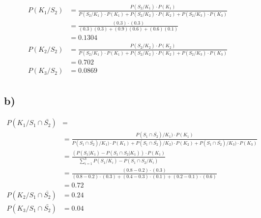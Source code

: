 \documentclass{article}
\begin{document}
\begin{align*}
P(K_1/ S_2) &= \frac{P(S_2/K_1)\cdot P(K_1)}{P(S_2/K_1)\cdot P(K_1) + P(S_2/K_2)\cdot P(K_2) + P(S_2/K_3)\cdot P(K_3)} \\
	&= \frac{(0.3) \cdot (0.3)}{(0.3)(0.3)+(0.9)(0.6) + (0.6)(0.1)}\\
	&= 0.1304\\
P(K_2 / S_2) &= \frac{P(S_2/K_2)\cdot P(K_2)}{P(S_2/K_1)\cdot P(K_1) + P(S_2/K_2)\cdot P(K_2) + P(S_2/K_3)\cdot P(K_3)} \\
	&= 0.702\\
P(K_3 / S_2) &= 0.0869 \\
\end{align*}

\subsection*{b)}

\begin{align*}
P(K_1 / S_1 \cap \bar{S_2}) &= \\
&= \frac{P ( S_1 \cap \bar{S_2}) / K_1) \cdot P(K_1)}{P ( S_1 \cap \bar{S_2}) / K_1) \cdot P(K_1) + P ( S_1 \cap \bar{S_2}) / K_2) \cdot P(K_2) + P ( S_1 \cap \bar{S_2}) / K_3) \cdot P(K_3)} \\
&=  \frac{(P(S_1| K_1) - P(S_1 \cap S_2 | K_1)) \cdot P(K_1)}{\sum_{i=1}^{3}{P(S_1/K_i)-P(S_1 \cap S_2 / K_i)}} \\
&= \frac{(0.8 - 0.2) \cdot(0.3)}{(0.8 - 0.2) \cdot(0.3) + (0.4 - 0.3) \cdot(0.1) + (0.2 - 0.1) \cdot(0.6)} \\
&= 0.72\\
P(K_2 / S_1 \cap \bar{S_2}) &=  0.24 \\
P(K_3 / S_1 \cap \bar{S_2}) &= 0.04 
\end{align*}
\end{document}
